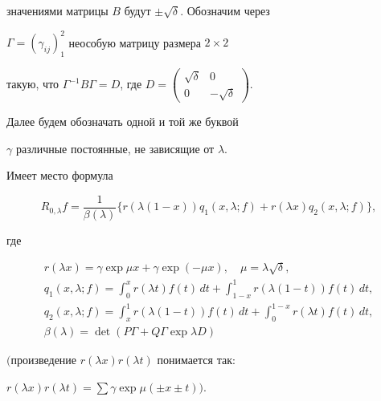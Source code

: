 значениями матрицы $B$ будут $\pm\sqrt{\delta}$. Обозначим через


$\Gamma=(\gamma_{ij})_1^2$ неособую матрицу размера $2\times 2$


такую, что $\Gamma^{-1}B\Gamma=D$, где $D=\begin{pmatrix}


\sqrt\delta&0\\ 0&-\sqrt\delta \end{pmatrix}$.


Далее будем обозначать одной и той же буквой


$\gamma$ различные постоянные, не зависящие от $\lambda$.





\begin{lem}


Имеет место формула


\begin{equation}


R_{0,\lambda}f=\frac{1}{\beta(\lambda)}\{ r(\lambda(1-x))q_1(x,\lambda;f)+


r(\lambda x)q_2(x,\lambda;f)\},


\end{equation}


где


\begin{gather*}


r(\lambda x) =\gamma\exp\mu x+\gamma\exp(-\mu x),\quad


\mu=\lambda\sqrt\delta, \\


q_1(x,\lambda;f)=\int_0^x r(\lambda t)f(t)\, dt+


\int_{1-x}^1 r(\lambda(1-t))f(t)\, dt,\\


q_2(x,\lambda;f)=\int_x^1 r(\lambda(1-t))f(t)\, dt+


\int_0^{1-x} r(\lambda t)f(t)\, dt, \\


\beta(\lambda)=\det(P\Gamma+Q\Gamma\exp\lambda D)


\end{gather*}


$($произведение $r(\lambda x)r(\lambda t)$ понимается так\/$:$


$r(\lambda x)r(\lambda t)=\sum\gamma\exp\mu(\pm x\pm t))$.


\end{lem}






